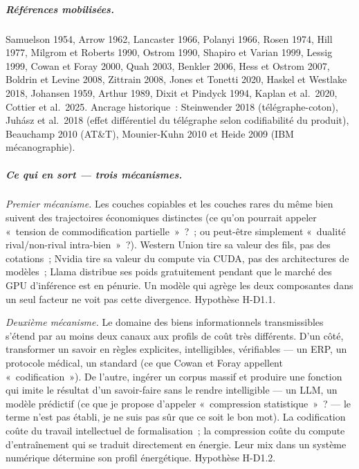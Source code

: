 \subparagraph{Références mobilisées.}
Samuelson 1954, Arrow 1962, Lancaster 1966, Polanyi 1966, Rosen 1974, Hill 1977, Milgrom et Roberts 1990, Ostrom 1990, Shapiro et Varian 1999, Lessig 1999, Cowan et Foray 2000, Quah 2003, Benkler 2006, Hess et Ostrom 2007, Boldrin et Levine 2008, Zittrain 2008, Jones et Tonetti 2020, Haskel et Westlake 2018, Johansen 1959, Arthur 1989, Dixit et Pindyck 1994, Kaplan et al.\ 2020, Cottier et al.\ 2025. Ancrage historique~: Steinwender 2018 (télégraphe-coton), Juhász et al.\ 2018 (effet différentiel du télégraphe selon codifiabilité du produit), Beauchamp 2010 (AT\&T), Mounier-Kuhn 2010 et Heide 2009 (IBM mécanographie).

\subparagraph{Ce qui en sort --- trois mécanismes.}

\emph{Premier mécanisme.} Les couches copiables et les couches rares du même bien suivent des trajectoires économiques distinctes (ce qu'on pourrait appeler «~tension de commodification partielle~»~?~; ou peut-être simplement «~dualité rival/non-rival intra-bien~»~?). Western Union tire sa valeur des fils, pas des cotations~; Nvidia tire sa valeur du compute via CUDA, pas des architectures de modèles~; Llama distribue ses poids gratuitement pendant que le marché des GPU d'inférence est en pénurie. Un modèle qui agrège les deux composantes dans un seul facteur ne voit pas cette divergence. Hypothèse H-D1.1.

\emph{Deuxième mécanisme.} Le domaine des biens informationnels transmissibles s'étend par au moins deux canaux aux profils de coût très différents. D'un côté, transformer un savoir en règles explicites, intelligibles, vérifiables --- un ERP, un protocole médical, un standard (ce que Cowan et Foray appellent «~codification~»). De l'autre, ingérer un corpus massif et produire une fonction qui imite le résultat d'un savoir-faire sans le rendre intelligible --- un LLM, un modèle prédictif (ce que je propose d'appeler «~compression statistique~»~? --- le terme n'est pas établi, je ne suis pas sûr que ce soit le bon mot). La codification coûte du travail intellectuel de formalisation~; la compression coûte du compute d'entraînement qui se traduit directement en énergie. Leur mix dans un système numérique détermine son profil énergétique. Hypothèse H-D1.2.

